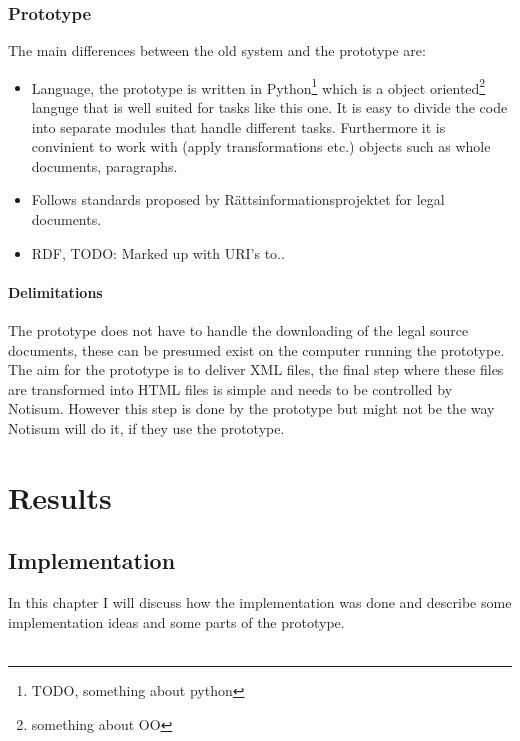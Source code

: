 \documentclass[a4paper,11pt]{kth-mag}
\begin{document}
\section{Prototype}
The main differences between the old system and the prototype are: 
\begin{itemize}
\item Language, the prototype is written in Python\footnote{TODO, something about python} which is a object oriented\footnote{something about OO} languge that is well suited for tasks like this one. It is easy to divide the code into separate modules that handle different tasks. Furthermore it is convinient to work with (apply transformations etc.) objects such as whole documents, paragraphs. 
\item Follows standards proposed by Rättsinformationsprojektet for legal documents.   
\item RDF, TODO: Marked up with URI's to.. 
\end{itemize} 

\subsection{Delimitations}
The prototype does not have to handle the downloading of the legal source documents, these can be presumed exist on the computer running the prototype. \\The aim for the prototype is to deliver XML files, the final step where these files are transformed into HTML files is simple and needs to be controlled by Notisum. However this step is done by the prototype but might not be the way Notisum will do it, if they use the prototype.

\part{Results}

\chapter{Implementation}

In this chapter I will discuss how the implementation was done and describe some implementation ideas and some parts of the prototype.\\\\
\end{document}
